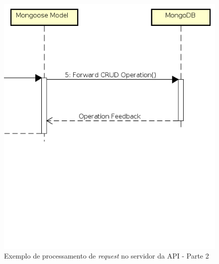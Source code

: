 \begin{figure}
    \begin{center}
        \includegraphics[scale=0.7]{imagens/API_Sequence_Diagram_2.png}
    \end{center}
	\caption{\label{fig:seq_api_2}Exemplo de processamento de \textit{request} no servidor da API - Parte 2}
\end{figure}
